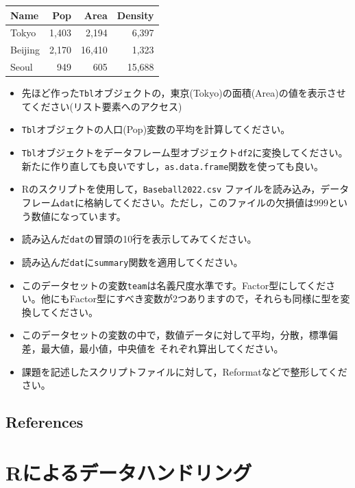 \documentclass[
  a4paper,
]{ltjsbook}
\begin{document}
\begin{longtable}[]{@{}lrrr@{}}
\toprule\noalign{}
Name & Pop & Area & Density \\
\midrule\noalign{}
\endhead
\bottomrule\noalign{}
\endlastfoot
Tokyo & 1,403 & 2,194 & 6,397 \\
Beijing & 2,170 & 16,410 & 1,323 \\
Seoul & 949 & 605 & 15,688 \\
\end{longtable}

\begin{itemize}
\item
  先ほど作った\texttt{Tbl}オブジェクトの，東京(Tokyo)の面積(Area)の値を表示させてください(リスト要素へのアクセス)
\item
  \texttt{Tbl}オブジェクトの人口(Pop)変数の平均を計算してください。
\item
  \texttt{Tbl}オブジェクトをデータフレーム型オブジェクト\texttt{df2}に変換してください。新たに作り直しても良いですし，\texttt{as.data.frame}関数を使っても良い。
\item
  Rのスクリプトを使用して，\texttt{Baseball2022.csv}
  ファイルを読み込み，データフレーム\texttt{dat}に格納してください。ただし，このファイルの欠損値は\(999\)という数値になっています。
\item
  読み込んだ\texttt{dat}の冒頭の10行を表示してみてください。
\item
  読み込んだ\texttt{dat}に\texttt{summary}関数を適用してください。
\item
  このデータセットの変数\texttt{team}は名義尺度水準です。Factor型にしてください。他にもFactor型にすべき変数が2つありますので，それらも同様に型を変換してください。
\item
  このデータセットの変数の中で，数値データに対して平均，分散，標準偏差，最大値，最小値，中央値を
  それぞれ算出してください。
\item
  課題を記述したスクリプトファイルに対して，Reformatなどで整形してください。
\end{itemize}

\section{References}\label{references-1}



\chapter{Rによるデータハンドリング}\label{rux306bux3088ux308bux30c7ux30fcux30bfux30cfux30f3ux30c9ux30eaux30f3ux30b0}
\end{document}
